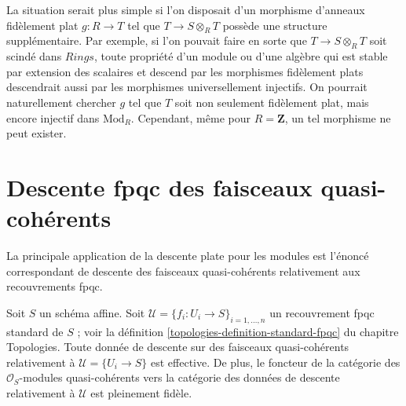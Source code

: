 \begin{remark}
\label{remark-when-locally-split}
La situation serait plus simple si l'on disposait d'un morphisme d'anneaux
fidèlement plat $g: R \to T$ tel que $T \to S \otimes_R T$
possède une structure supplémentaire.
Par exemple, si l'on pouvait faire en sorte que $T \to S \otimes_R T$
soit scindé dans $\textit{Rings}$, toute propriété d'un module ou d'une algèbre
qui est stable par extension des scalaires et descend par les morphismes
fidèlement plats descendrait aussi par les morphismes universellement injectifs.
On pourrait naturellement chercher $g$ tel que $T$ soit non seulement
fidèlement plat, mais encore injectif dans $\text{Mod}_R$.
Cependant, même pour $R = \mathbf{Z}$, un tel morphisme ne peut exister.
\end{remark}
















\section{Descente fpqc des faisceaux quasi-cohérents}
\label{section-fpqc-descent-quasi-coherent}

\noindent
La principale application de la descente plate pour les modules
est l'énoncé correspondant de descente des faisceaux quasi-cohérents
relativement aux recouvrements fpqc.

\begin{lemma}
\label{lemma-standard-fpqc-covering}
Soit $S$ un schéma affine.
Soit $\mathcal{U} = \{f_i : U_i \to S\}_{i = 1, \ldots, n}$
un recouvrement fpqc standard de $S$ ; voir la définition
\ref{topologies-definition-standard-fpqc} du chapitre Topologies.
Toute donnée de descente sur des faisceaux quasi-cohérents
relativement à $\mathcal{U} = \{U_i \to S\}$ est effective.
De plus, le foncteur de la catégorie des $\mathcal{O}_S$-modules
quasi-cohérents vers la catégorie des données de descente
relativement à $\mathcal{U}$ est pleinement fidèle.
\end{lemma}

